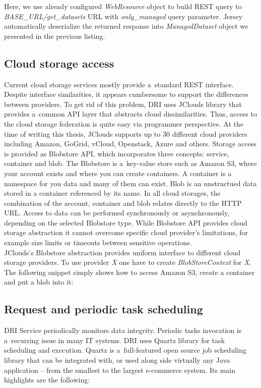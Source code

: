 Here, we use already configured \textit{WebResource} object to build REST query to 
\textit{BASE\_URL/get\_datasets} URL with \textit{only\_managed} query parameter. Jersey
automatically deserialize the returned response into \textit{ManagedDataset} object
we presented in the previous listing.\\

\subsection{Cloud storage access}
Current cloud storage services mostly provide a~standard REST interface.
Despite interface similarities, it appears cumbersome to support the
differences between providers. To get rid of this problem, DRI uses JClouds
\cite{jclouds} library that provides a~common API layer that abstracts cloud
dissimilarities. Thus, access to the cloud storage federation is quite easy
via programmer perspective. At the time of writing this thesis, JClouds
supports up to 30 different cloud providers including Amazon, GoGrid, vCloud,
Openstack, Azure and others. Storage access is provided as Blobstore API, which
incorporates three concepts: service, container and blob. The Blobstore is
a~key-value store such as Amazon S3, where your account exists and where you
can create containers. A container is a namespace for you data and many of them
can exist. Blob is an unstructued data stored in a container referenced by
its name. In all cloud storages, the combination of the account, container and
blob relates directly to the HTTP URL. Access to data can be performed
synchronously or asynchronously, depending on the selected Blobstore type.
While Blobstore API provides cloud storage abstraction it cannot overcome
specific cloud provider's limitations, for example size limits or timeouts
between sensitive operations.\\

JClouds's Blobstore abstraction provides uniform interface to different cloud storage
providers. To use provider \textit{X} one have to create \textit{BlobStoreContext}
for \textit{X}. The following snippet simply shows how to access Amazon S3, create a
container and put a blob into it:



\subsection{Request and periodic task scheduling}
DRI Service periodically monitors data integrity. Periodic tasks invocation
is a~recurring issue in many IT systems. DRI uses Quartz library \cite{quartz}
for task scheduling and execution. Quartz is a~full-featured open source job scheduling
library that can be integrated with, or used along side virtually any Java
application -- from the smallest to the largest e-commerce system. Its main highlights
are the following:

